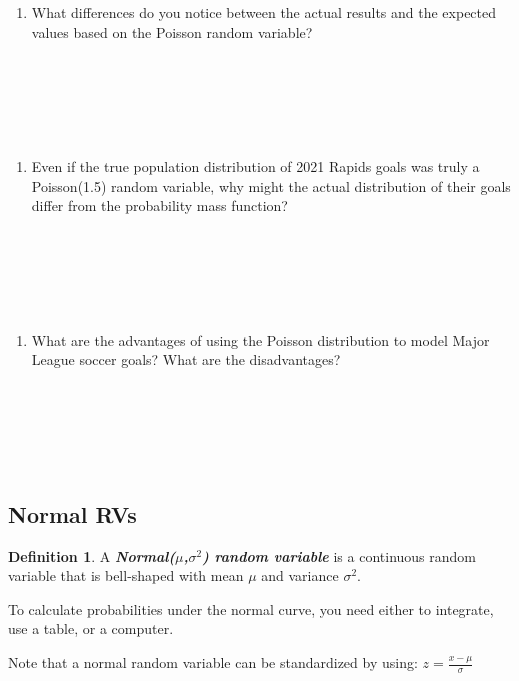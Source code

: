 \documentclass[
  11pt,
]{book}
\providecommand{\tightlist}{%
  \setlength{\itemsep}{0pt}\setlength{\parskip}{0pt}}
\theoremstyle{definition}
\newtheorem{definition}{Definition}[chapter]
\theoremstyle{definition}
\theoremstyle{definition}
\theoremstyle{definition}
\theoremstyle{remark}
\begin{document}
\begin{enumerate}
\def\labelenumi{(\alph{enumi})}
\setcounter{enumi}{1}
\tightlist
\item
  What differences do you notice between the actual results and the expected values based on the Poisson random variable?\\
  \strut \\
  \strut \\
  \strut \\
\end{enumerate}

\begin{enumerate}
\def\labelenumi{(\alph{enumi})}
\setcounter{enumi}{2}
\tightlist
\item
  Even if the true population distribution of 2021 Rapids goals was truly a Poisson(1.5) random variable, why might the actual distribution of their goals differ from the probability mass function?\\
  \strut \\
  \strut \\
  \strut \\
\end{enumerate}

\begin{enumerate}
\def\labelenumi{(\alph{enumi})}
\setcounter{enumi}{3}
\tightlist
\item
  What are the advantages of using the Poisson distribution to model Major League soccer goals? What are the disadvantages?\\
  \strut \\
  \strut \\
  \strut \\
\end{enumerate}

\hypertarget{normal-rvs}{%
\subsection{Normal RVs}\label{normal-rvs}}

\begin{definition}
A \textbf{\emph{Normal(\(\mu\),\(\sigma^2\)) random variable}} is a continuous random variable that is bell-shaped with mean \(\mu\) and variance \(\sigma^2\).

To calculate probabilities under the normal curve, you need either to integrate, use a table, or a computer.

Note that a normal random variable can be standardized by using: \(z = \frac{x-\mu}{\sigma}\)
\end{definition}
\end{document}

